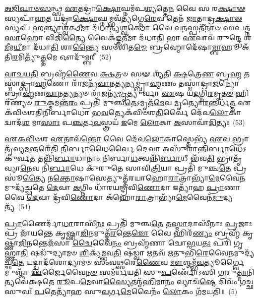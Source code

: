 \-\ul{𑌅}\-\-\ul{𑌜𑌿}\-\-\ul{𑌘𑌾}\-\-\ul{𑍞}\-\-\ul{𑌸}\-𑌨𑍍𑌥𑍍𑌸 \ul{𑌏}\-𑌤𑌦𑍍𑌰𑌾॑\-\ul{𑌕𑍍𑌷𑍋}\-𑌘𑍍𑌨𑌮᳴𑌪\-\ul{𑌶𑍍𑌯}\-𑌤𑍍𑌤𑍇\-\ul{𑌨} 𑌵𑍈 𑌸 𑌰\-\ul{𑌕𑍍𑌷𑌾}\-\-\ul{𑍟}\-𑌸𑍍𑌯𑌪𑌾᳴𑌹\-\ul{𑌤} 𑌯𑌦𑍍𑌰𑌾॑\-\ul{𑌕𑍍𑌷𑍋}\-𑌘𑍍𑌨𑌮𑍍𑌭𑌵᳴\-\ul{𑌤𑍍𑌯}\-𑌗𑍍𑌨𑍇\-\ul{𑌰𑍇}\-𑌵 𑌤𑍇𑌨᳴ \ul{𑌜𑌾}\-𑌤𑌾𑌦𑍍𑌰\-\ul{𑌕𑍍𑌷𑌾}\-\-\ul{𑍟}\-𑌸𑍍𑌯𑌪᳴ \ul{𑌹}\-𑌨𑍍𑌤𑍍𑌯𑌾𑌶𑍍𑌵᳴\-\ul{𑌤𑍍𑌥𑍀}\-𑌮𑌾 𑌦᳴𑌧𑌾𑌤𑍍𑌯\-\ul{𑌶𑍍𑌵}\-𑌤𑍍𑌥𑍋 𑌵𑍈 𑌵\-\ul{𑌨}\-𑌸𑍍𑌪𑌤𑍀᳴𑌨𑌾𑍞 𑌸𑌪𑌤𑍍𑌨\-\ul{𑌸𑌾}\-𑌹𑍋 𑌵𑌿𑌜𑌿᳴\-\ul{𑌤𑍍𑌯𑍈} 𑌵𑍈𑌕᳴𑌙𑍍𑌕\-\ul{𑌤𑍀}\-𑌮𑌾 𑌦᳴𑌧𑌾\-\ul{𑌤𑌿} 𑌭𑌾 \ul{𑌏}\-𑌵𑌾𑌵᳴ 𑌰𑍁𑌨𑍍𑌦𑍍𑌧𑍇 𑌶\-\ul{𑌮𑍀}\-𑌮\-\ul{𑌯𑍀}\-𑌮𑌾 𑌦᳴𑌧𑌾\-\ul{𑌤𑌿} 𑌶𑌾\-\ul{𑌨𑍍𑌤𑍍𑌯𑍈} 𑌸𑍞᳴𑌶𑌿𑌤\-\ul{𑌮𑍍𑌮𑍇} 𑌬𑍍𑌰𑌹𑍍𑌮𑍋𑌦𑍇᳴𑌷𑌾\-\ul{𑌮𑍍𑌬𑌾}\-𑌹𑍂 𑌅᳴𑌤𑌿\-\ul{𑌰}\-𑌮𑌿𑌤𑍍𑌯𑍁᳴\-\ul{𑌤𑍍𑌤}\-𑌮𑍇 𑌔𑌦𑍁᳴𑌮𑍍𑌬𑌰𑍀~(52)

\-\ul{𑌵𑌾}\-\-\ul{𑌚}\-\-\ul{𑌯}\-\-\ul{𑌤𑌿} 𑌬𑍍𑌰𑌹𑍍𑌮᳴\-\ul{𑌣𑍈}\-𑌵 \ul{𑌕𑍍𑌷}\-𑌤𑍍𑌰𑍞 𑌸𑍟 𑌶𑍍𑌯᳴𑌤𑌿 \ul{𑌕𑍍𑌷}\-𑌤𑍍𑌰𑍇\-\ul{𑌣} 𑌬𑍍𑌰\-\ul{𑌹𑍍𑌮} 𑌤𑌸𑍍𑌮𑌾॑𑌦𑍍𑌬𑍍𑌰𑌾\-\ul{𑌹𑍍𑌮}\-𑌣𑍋 𑌰𑌾᳴\-\ul{𑌜}\-𑌨𑍍𑌯᳴\-\ul{𑌵𑌾}\-𑌨\-\ul{𑌤𑍍𑌯}\-𑌨𑍍𑌯𑌮𑍍𑌬𑍍𑌰𑌾॑\-\ul{𑌹𑍍𑌮}\-𑌣𑌂 𑌤𑌸𑍍𑌮𑌾॑𑌦𑍍𑌰𑌾\-\ul{𑌜}\-𑌨𑍍𑌯𑍋॑ 𑌬𑍍𑌰𑌾\-\ul{𑌹𑍍𑌮}\-𑌣\-\ul{𑌵𑌾}\-𑌨\-\ul{𑌤𑍍𑌯}\-𑌨𑍍𑌯𑍞 𑌰𑌾᳴\-\ul{𑌜}\-𑌨𑍍𑌯᳴\-\ul{𑌮𑍍𑌮𑍃}\-𑌤𑍍𑌯𑍁𑌰𑍍𑌵𑌾 \ul{𑌏}\-𑌷 𑌯\-\ul{𑌦}\-𑌗𑍍𑌨𑌿\-\ul{𑌰}\-𑌮𑍃\-\ul{𑌤}\-\-\ul{𑍞} 𑌹𑌿𑌰᳴𑌣𑍍𑌯𑍞 \ul{𑌰𑍁}\-𑌕𑍍𑌮𑌮𑌨𑍍𑌤᳴\-\ul{𑌰𑌂} 𑌪𑍍𑌰𑌤𑌿᳴ 𑌮𑍁𑌞𑍍𑌚\-\ul{𑌤𑍇}\-\-𑌽𑌮𑍃𑌤᳴\-\ul{𑌮𑍇}\-𑌵 \ul{𑌮𑍃}\-𑌤𑍍𑌯𑍋\-\ul{𑌰}\-𑌨𑍍𑌤𑌰𑍍𑌧᳴\-\ul{𑌤𑍍𑌤} 𑌏𑌕᳴𑌵𑌿𑍞𑌶𑌤𑌿𑌨𑌿𑌰𑍍𑌬𑌾𑌧𑍋 𑌭\-\ul{𑌵}\-𑌤𑍍𑌯𑍇𑌕᳴𑌵𑌿𑍞𑌶\-\ul{𑌤𑌿}\-𑌰𑍍𑌵𑍈 𑌦𑍇᳴𑌵\-\ul{𑌲𑍋}\-𑌕𑌾 𑌦𑍍𑌵𑌾𑌦᳴\-\ul{𑌶} 𑌮𑌾\-\ul{𑌸𑌾𑌃} 𑌪\-\ul{𑌞𑍍𑌚}\-𑌰𑍍𑌤\-\ul{𑌵}\-𑌸𑍍𑌤𑍍𑌰𑌯᳴ \ul{𑌇}\-𑌮𑍇 \ul{𑌲𑍋}\-𑌕𑌾 \ul{𑌅}\-𑌸𑌾𑌵𑌾᳴\-\ul{𑌦𑌿}\-𑌤𑍍𑌯𑌃~(53)

\-\ul{𑌏}\-\-\ul{𑌕}\-\-\ul{𑌵𑌿}\-\-\ul{𑍞}\-𑌶 \ul{𑌏}\-𑌤𑌾𑌵᳴\-\ul{𑌨𑍍𑌤𑍋} 𑌵𑍈 𑌦𑍇᳴𑌵\-\ul{𑌲𑍋}\-𑌕𑌾𑌸𑍍𑌤𑍇𑌭𑍍𑌯᳴ \ul{𑌏}\-𑌵 𑌭𑍍𑌰𑌾𑌤𑍃᳴𑌵𑍍𑌯\-\ul{𑌮}\-𑌨𑍍𑌤𑌰𑍇᳴𑌤𑌿 𑌨𑌿\-\ul{𑌰𑍍𑌬𑌾}\-𑌧𑍈𑌰𑍍𑌵𑍈 \ul{𑌦𑍇}\-𑌵𑌾 𑌅𑌸𑍁᳴𑌰𑌾𑌨𑍍𑌨𑌿\-\ul{𑌰𑍍𑌬𑌾}\-𑌧𑍇᳴\-𑌽𑌕𑍁𑌰𑍍𑌵\-\ul{𑌤} 𑌤𑌨𑍍𑌨𑌿᳴\-\ul{𑌰𑍍𑌬𑌾}\-𑌧𑌾𑌨𑌾𑌂॑ 𑌨𑌿𑌰𑍍𑌬𑌾\-\ul{𑌧}\-𑌤𑍍𑌵𑌨𑍍𑌨𑌿᳴\-\ul{𑌰𑍍𑌬𑌾}\-𑌧𑍀 𑌭᳴𑌵\-\ul{𑌤𑌿} 𑌭𑍍𑌰𑌾𑌤𑍃᳴𑌵𑍍𑌯𑌾\-\ul{𑌨𑍇}\-𑌵 𑌨𑌿᳴\-\ul{𑌰𑍍𑌬𑌾}\-𑌧𑍇 𑌕𑍁᳴𑌰𑍁𑌤𑍇 𑌸𑌾𑌵𑌿\-\ul{𑌤𑍍𑌰𑌿}\-𑌯𑌾 𑌪𑍍𑌰𑌤𑌿᳴ 𑌮𑍁𑌞𑍍𑌚\-\ul{𑌤𑍇} 𑌪𑍍𑌰𑌸𑍂॑\-\ul{𑌤𑍍𑌯𑍈} 𑌨\-\ul{𑌕𑍍𑌤𑍋}\-𑌷𑌾𑌸𑍇𑌤𑍍𑌯𑍁𑌤𑍍𑌤᳴𑌰𑌯𑌾𑌹𑍋\-\ul{𑌰𑌾}\-𑌤𑍍𑌰𑌾𑌭𑍍𑌯𑌾᳴\-\-\ul{𑌮𑍇}\-𑌵𑍈\-\ul{𑌨}\-𑌮𑍁𑌦𑍍𑌯᳴𑌚𑍍𑌛𑌤𑍇 \ul{𑌦𑍇}\-𑌵𑌾 \ul{𑌅}\-𑌗𑍍𑌨𑌿𑌂 𑌧𑌾᳴𑌰𑌯𑌨𑍍𑌦𑍍𑌰𑌵𑌿\-\ul{𑌣𑍋}\-𑌦𑌾 𑌇𑌤𑍍𑌯𑌾᳴𑌹 \ul{𑌪𑍍𑌰𑌾}\-𑌣𑌾 𑌵𑍈 \ul{𑌦𑍇}\-𑌵𑌾 𑌦𑍍𑌰᳴𑌵𑌿\-\ul{𑌣𑍋}\-𑌦𑌾 𑌅᳴𑌹𑍋\-\ul{𑌰𑌾}\-𑌤𑍍𑌰𑌾𑌭𑍍𑌯𑌾᳴\-\ul{𑌮𑍇}\-𑌵𑍈𑌨᳴\-\ul{𑌮𑍁}\-𑌦𑍍𑌯𑌤𑍍𑌯᳴~(54)

\-\ul{𑌪𑍍𑌰𑌾}\-𑌣𑍈𑌰𑍍𑌦𑌾᳴\-\ul{𑌧𑌾}\-𑌰𑌾𑌸𑍀᳴\-\ul{𑌨𑌃} 𑌪𑍍𑌰𑌤𑌿᳴ 𑌮𑍁𑌞𑍍𑌚\-\ul{𑌤𑍇} 𑌤\-\ul{𑌸𑍍𑌮𑌾}\-𑌦𑌾𑌸𑍀᳴𑌨𑌾𑌃 \ul{𑌪𑍍𑌰}\-𑌜𑌾𑌃 𑌪𑍍𑌰 𑌜𑌾᳴𑌯𑌨𑍍𑌤𑍇 𑌕𑍃𑌷𑍍𑌣𑌾\-\ul{𑌜𑌿}\-𑌨𑌮𑍁𑌤𑍍𑌤᳴\-\ul{𑌰}\-𑌨𑍍𑌤𑍇\-\ul{𑌜𑍋} 𑌵𑍈 𑌹𑌿𑌰᳴\-\ul{𑌣𑍍𑌯𑌂} 𑌬𑍍𑌰𑌹𑍍𑌮᳴ 𑌕𑍃𑌷𑍍𑌣𑌾\-\ul{𑌜𑌿}\-𑌨𑌨𑍍𑌤𑍇𑌜᳴𑌸𑌾 \ul{𑌚𑍈}\-𑌵𑍈\-\ul{𑌨𑌂} 𑌬𑍍𑌰𑌹𑍍𑌮᳴𑌣𑌾 𑌚𑍋\-\ul{𑌭}\-𑌯\-\ul{𑌤𑌃} 𑌪𑌰𑌿᳴ 𑌗𑍃𑌹𑍍𑌣𑌾\-\ul{𑌤𑌿} 𑌷𑌡𑍁᳴𑌦𑍍𑌯𑌾𑌮𑍞 \ul{𑌶𑌿}\-𑌕𑍍𑌯᳴𑌮𑍍𑌭𑌵\-\ul{𑌤𑌿} 𑌷𑌡𑍍𑌵𑌾 \ul{𑌋}\-𑌤𑌵᳴ \ul{𑌋}\-𑌤𑍁𑌭𑌿᳴\-\ul{𑌰𑍇}\-𑌵𑍈\-\ul{𑌨}\-𑌮𑍁𑌦𑍍𑌯᳴𑌚𑍍𑌛\-\ul{𑌤𑍇} 𑌯𑌦𑍍𑌦𑍍𑌵𑌾𑌦᳴𑌶𑍋𑌦𑍍𑌯𑌾𑌮𑍞 𑌸𑌂𑌵\-\ul{𑌥𑍍𑌸}\-𑌰𑍇\-\ul{𑌣𑍈}\-𑌵 \ul{𑌮𑍗}\-𑌞𑍍𑌜𑌮𑍍𑌭᳴\-\ul{𑌵}\-𑌤𑍍𑌯𑍂𑌰𑍍𑌗𑍍𑌵𑍈 𑌮𑍁𑌞𑍍𑌜𑌾᳴ \ul{𑌊}\-𑌰𑍍𑌜𑍈𑌵𑍈\-\ul{𑌨}\-\-\ul{𑍞} 𑌸𑌮᳴𑌰𑍍𑌧𑌯𑌤𑌿 𑌸𑍁\-\ul{𑌪}\-𑌰𑍍𑌣𑍋᳴\-𑌽𑌸𑌿 \ul{𑌗}\-𑌰𑍁\-\ul{𑌤𑍍𑌮𑌾}\-𑌨𑌿𑌤𑍍𑌯𑌵𑍇॑𑌕𑍍𑌷𑌤𑍇 \ul{𑌰𑍂}\-𑌪\-\ul{𑌮𑍇}\-𑌵𑌾\-\ul{𑌸𑍍𑌯𑍈}\-𑌤𑌨𑍍𑌮᳴\-\ul{𑌹𑌿}\-𑌮𑌾\-\ul{𑌨𑌂} 𑌵𑍍𑌯𑌾𑌚᳴\-\ul{𑌷𑍍𑌟𑍇} 𑌦𑌿𑌵𑌂᳴ 𑌗\-\ul{𑌚𑍍𑌛} 𑌸𑍁𑌵𑌃᳴ \ul{𑌪}\-𑌤𑍇𑌤𑍍𑌯𑌾᳴𑌹 𑌸𑍁\-\ul{𑌵}\-𑌰𑍍𑌗\-\ul{𑌮𑍇}\-𑌵𑍈𑌨𑌂᳴ \ul{𑌲𑍋}\-𑌕𑌂 𑌗᳴𑌮𑌯𑌤𑌿॥~(5)


